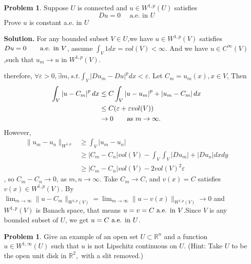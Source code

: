 \documentclass[a4paper]{book}
\newenvironment{solution}%
{\noindent\textbf{Solution.}}%
{\qedhere}
\numberwithin{equation}{chapter}
\theoremstyle{definition}
\newtheorem{problem}[exm]{Problem}
\begin{document}
\begin{problem}
  Suppose $U$ is connected and $u \in W^{1, p}(U)$ satisfies
  \[
    D u=0 \quad \text { a.e. in } U
  \]
  Prove $u$ is constant a.e. in $U$
\end{problem}

\begin{solution}
  For any bounded subset $V \in U$,we have $u \in W^{1,p}(V)$ satisfies $Du = 0\qquad \textmd{a.e. in } V$, assume $\int_V 1 dx = vol(V)< \infty$. And we have $u \in C^\infty(V)$,such that $u_m \rightarrow u$ in $W^{1,p}(V)$.

  therefore, $\forall \varepsilon > 0 , \exists m, s.t. \int_V \left| Du_m - Du \right|^p dx < \varepsilon$. Let $C_m = u_m(x), x \in V$, Then 
  \begin{align*}
    \int_V \left| u - C_m \right|^p dx & \leq C\int_V \left| u - u_m \right|^p + \left| u_m -C_m \right| dx \\
                                       & \leq C(\varepsilon + \varepsilon vol(V))\\
                                         &\rightarrow 0 \qquad \textmd{as } m \rightarrow \infty.
  \end{align*}
  However,
  \begin{align*}
    \| u_m -u_n\|_{W^{1,p}} &\geq \int_V \left| u_m -u_n \right| \\
                            &\geq \left| C_m -C_n \right| vol(V) - \int_V\int_V\left| Du_m \right| +\left| Du_n \right|dxdy \\
    &\geq \left| C_m -C_n \right| vol(V) - 2 vol(V)^2 \varepsilon
  \end{align*},
  so $C_m - C_n \rightarrow 0$, as $m,n \rightarrow \infty$. Take $C_m \rightarrow C$, and $v(x)= C$ satisfies $v(x) \in W^{1,p}(V)$. By $\lim_{m \rightarrow \infty} \| u - C_m\|_{W^{1,p}(V)} = \lim_{m \rightarrow \infty} \| u - v(x)\|_{W^{1,p}(V)} \rightarrow 0$ and $W^{1,p}(V)$ is Banach space, that means $u = v = C \textmd{ a.e.  in } V$.Since $V$ is any bounded subset of $U$, we get $u = C \textmd{ a.e. in } U$.
\end{solution}

\begin{problem}
  Give an example of an open set $U \subset \mathbb{R}^{n}$ and a function $u \in W^{1, \infty}(U)$ such that $u$ is not Lipschitz continuous on $U$. (Hint: Take $U$ to be the open unit disk in $\mathbb{R}^{2},$ with a slit removed.)
\end{problem}
\end{document}
